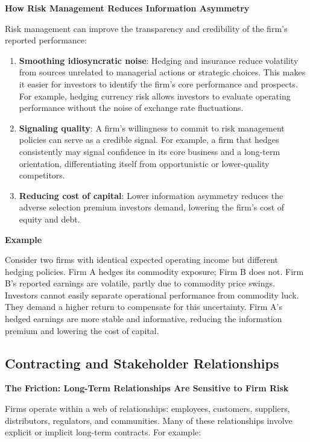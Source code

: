 \documentclass[11pt,openany]{book}
\begin{document}
\textbf{How Risk Management Reduces Information Asymmetry}

Risk management can improve the transparency and credibility of the firm's reported performance:

\begin{enumerate}
\def\labelenumi{\arabic{enumi}.}
\item
  \textbf{Smoothing idiosyncratic noise}: Hedging and insurance reduce volatility from sources unrelated to managerial actions or strategic choices. This makes it easier for investors to identify the firm's core performance and prospects. For example, hedging currency risk allows investors to evaluate operating performance without the noise of exchange rate fluctuations.
\item
  \textbf{Signaling quality}: A firm's willingness to commit to risk management policies can serve as a credible signal. For example, a firm that hedges consistently may signal confidence in its core business and a long-term orientation, differentiating itself from opportunistic or lower-quality competitors.
\item
  \textbf{Reducing cost of capital}: Lower information asymmetry reduces the adverse selection premium investors demand, lowering the firm's cost of equity and debt.
\end{enumerate}

\textbf{Example}

Consider two firms with identical expected operating income but different hedging policies. Firm A hedges its commodity exposure; Firm B does not. Firm B's reported earnings are volatile, partly due to commodity price swings. Investors cannot easily separate operational performance from commodity luck. They demand a higher return to compensate for this uncertainty. Firm A's hedged earnings are more stable and informative, reducing the information premium and lowering the cost of capital.

\subsection{Contracting and Stakeholder Relationships}\label{contracting-and-stakeholder-relationships}

\textbf{The Friction: Long-Term Relationships Are Sensitive to Firm Risk}

Firms operate within a web of relationships: employees, customers, suppliers, distributors, regulators, and communities. Many of these relationships involve explicit or implicit long-term contracts. For example:
\end{document}
